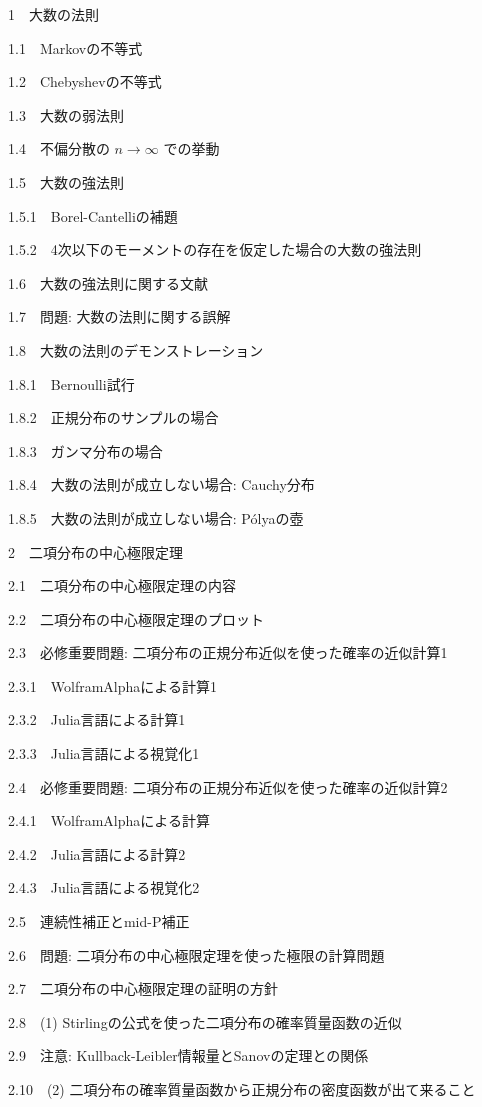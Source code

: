 \documentclass[
  letterpaper,
  DIV=11,
  numbers=noendperiod]{scrartcl}
\begin{document}
{{1~~}大数の法則}

{{1.1~~}Markovの不等式}

{{1.2~~}Chebyshevの不等式}

{{1.3~~}大数の弱法則}

{{1.4~~}不偏分散の \(n\to\infty\) での挙動}

{{1.5~~}大数の強法則}

{{1.5.1~~}Borel-Cantelliの補題}

{{1.5.2~~}4次以下のモーメントの存在を仮定した場合の大数の強法則}

{{1.6~~}大数の強法則に関する文献}

{{1.7~~}問題: 大数の法則に関する誤解}

{{1.8~~}大数の法則のデモンストレーション}

{{1.8.1~~}Bernoulli試行}

{{1.8.2~~}正規分布のサンプルの場合}

{{1.8.3~~}ガンマ分布の場合}

{{1.8.4~~}大数の法則が成立しない場合: Cauchy分布}

{{1.8.5~~}大数の法則が成立しない場合: Pólyaの壺}

{{2~~}二項分布の中心極限定理}

{{2.1~~}二項分布の中心極限定理の内容}

{{2.2~~}二項分布の中心極限定理のプロット}

{{2.3~~}必修重要問題: 二項分布の正規分布近似を使った確率の近似計算1}

{{2.3.1~~}WolframAlphaによる計算1}

{{2.3.2~~}Julia言語による計算1}

{{2.3.3~~}Julia言語による視覚化1}

{{2.4~~}必修重要問題: 二項分布の正規分布近似を使った確率の近似計算2}

{{2.4.1~~}WolframAlphaによる計算}

{{2.4.2~~}Julia言語による計算2}

{{2.4.3~~}Julia言語による視覚化2}

{{2.5~~}連続性補正とmid-P補正}

{{2.6~~}問題: 二項分布の中心極限定理を使った極限の計算問題}

{{2.7~~}二項分布の中心極限定理の証明の方針}

{{2.8~~}(1) Stirlingの公式を使った二項分布の確率質量函数の近似}

{{2.9~~}注意: Kullback-Leibler情報量とSanovの定理との関係}

{{2.10~~}(2) 二項分布の確率質量函数から正規分布の密度函数が出て来ること}
\end{document}
